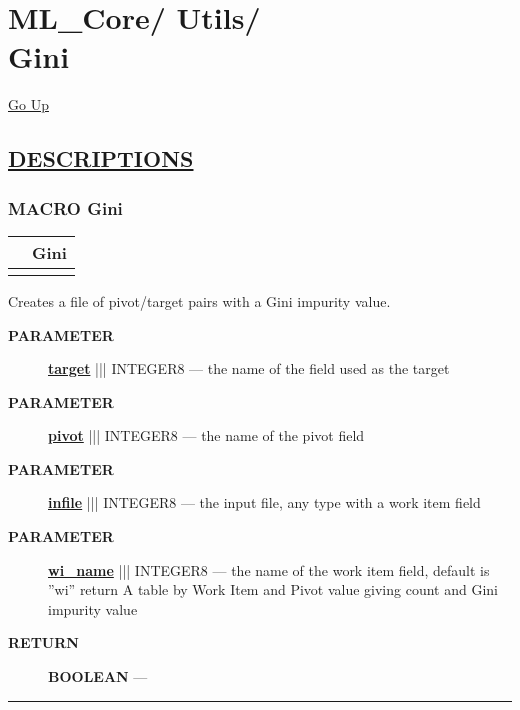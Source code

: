 \chapter*{\color{headfile}
{\large ML\_Core\slash\hspace{0pt}}
{\large Utils\slash\hspace{0pt}}
 \\
Gini
}
\hypertarget{ecldoc:toc:ML_Core.Utils.Gini}{}
\hyperlink{ecldoc:toc:root/ML_Core/Utils}{Go Up}


\section*{\underline{\textsf{DESCRIPTIONS}}}
\subsection*{\textsf{\colorbox{headtoc}{\color{white} MACRO}
Gini}}

\hypertarget{ecldoc:ml_core.utils.gini}{}

{\renewcommand{\arraystretch}{1.5}
\begin{tabularx}{\textwidth}{|>{\raggedright\arraybackslash}l|X|}
\hline
\hspace{0pt}\mytexttt{\color{red} } & \textbf{Gini} \\
\hline
\multicolumn{2}{|>{\raggedright\arraybackslash}X|}{\hspace{0pt}\mytexttt{\color{param} (infile, pivot, target, wi\_name='wi')}} \\
\hline
\end{tabularx}
}

\par





Creates a file of pivot/target pairs with a Gini impurity value.






\par
\begin{description}
\item [\colorbox{tagtype}{\color{white} \textbf{\textsf{PARAMETER}}}] \textbf{\underline{target}} ||| INTEGER8 --- the name of the field used as the target
\item [\colorbox{tagtype}{\color{white} \textbf{\textsf{PARAMETER}}}] \textbf{\underline{pivot}} ||| INTEGER8 --- the name of the pivot field
\item [\colorbox{tagtype}{\color{white} \textbf{\textsf{PARAMETER}}}] \textbf{\underline{infile}} ||| INTEGER8 --- the input file, any type with a work item field
\item [\colorbox{tagtype}{\color{white} \textbf{\textsf{PARAMETER}}}] \textbf{\underline{wi\_name}} ||| INTEGER8 --- the name of the work item field, default is ''wi'' return A table by Work Item and Pivot value giving count and Gini impurity value
\end{description}







\par
\begin{description}
\item [\colorbox{tagtype}{\color{white} \textbf{\textsf{RETURN}}}] \textbf{BOOLEAN} --- 
\end{description}




\rule{\linewidth}{0.5pt}
